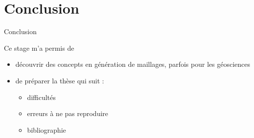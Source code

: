 \documentclass[aspectratio=169, 12pt, a4paper, hyperref={pdfauthor={Alexandre MARIN}, pdfkeywords={IFPEN, Delaunay, Voronoi, mesh generation}, colorlinks=true, linkcolor=purple, urlcolor=blue, citecolor=magenta}]{beamer}
\begin{document}
\section{Conclusion}
\begin{Energie}{Conclusion}

Ce stage m'a permis de

\begin{itemize}
\item découvrir des concepts en génération de maillages, parfois pour les géosciences
\item de préparer la thèse qui suit : 
\begin{itemize}
\item difficultés
\item erreurs à ne pas reproduire
\item bibliographie
\end{itemize}
\end{itemize}
\end{Energie}

\makeByeSlide
\end{document}
